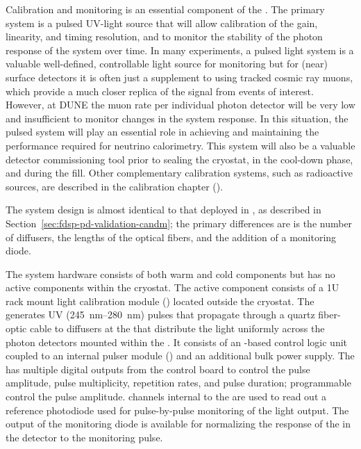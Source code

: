 Calibration and monitoring is an essential component of the .
The primary system is a pulsed UV-light source that will allow calibration of the  gain, linearity, and timing resolution, and to monitor the stability of the photon response of the system over time.
In many experiments, a pulsed light system is a valuable well-defined, controllable light source for monitoring but for (near) surface detectors it is often just a supplement to using tracked cosmic ray muons, which provide a much closer replica of the signal from events of interest. 
However, at DUNE the muon rate per individual photon detector will be very low and insufficient to monitor changes in the system response. In this situation, the pulsed system will play an essential role in achieving and maintaining the  performance required for neutrino calorimetry. 
This system will also be a valuable detector commissioning tool prior to sealing the cryostat, in the cool-down phase, and during the \lar fill.
Other complementary calibration systems, such as radioactive sources, are described in the calibration chapter (\spchcalib). 

The system design is almost identical to that deployed in , as described in Section~\ref{sec:fdsp-pd-validation-candm}; the primary differences are is the number of diffusers, the lengths of the optical fibers, and the addition of a monitoring diode.

The system hardware consists of both warm and cold components but has no active components within the cryostat. The active component consists of a 1U rack mount light calibration module () located outside the cryostat. The  generates UV (\SIrange{245}{280}{nm}) pulses that propagate through a quartz fiber-optic cable to diffusers at the  that distribute the light uniformly across the photon detectors mounted within the . 
It consists of an -based control logic unit coupled to an internal  pulser module () and an additional bulk power supply. 
The  has multiple digital outputs from the control board to control the pulse amplitude, pulse multiplicity, repetition rates, and pulse duration; programmable  control the  pulse amplitude.  channels internal to the  are used to read out a reference photodiode used for pulse-by-pulse monitoring of the  light output. The output of the monitoring diode is available for normalizing the response of the  in the detector to the monitoring pulse. 


